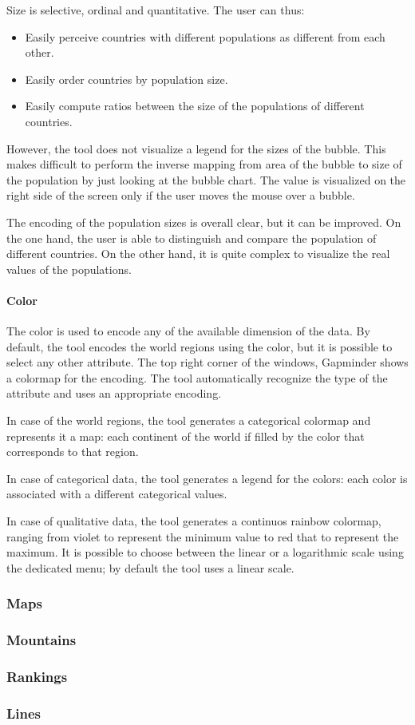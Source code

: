 Size is selective, ordinal and quantitative.
The user can thus:
\begin{itemize}
    \item Easily perceive countries with different populations as different from each other.
    \item Easily order countries by population size.
    \item Easily compute ratios between the size of the populations of different countries.
\end{itemize}

However, the tool does not visualize a legend for the sizes of the bubble.
This makes difficult to perform the inverse mapping from area of the bubble to size of the population by just looking at the bubble chart.
The value is visualized on the right side of the screen only if the user moves the mouse over a bubble.

The encoding of the population sizes is overall clear, but it can be improved.
On the one hand, the user is able to distinguish and compare the population of different countries.
On the other hand, it is quite complex to visualize the real values of the populations.


\paragraph{Color}
The color is used to encode any of the available dimension of the data.
By default, the tool encodes the world regions using the color, but it is possible to select any other attribute.
The top right corner of the windows, Gapminder shows a colormap for the encoding.
The tool automatically recognize the type of the attribute and uses an appropriate encoding.

In case of the world regions, the tool generates a categorical colormap and represents it a map:
each continent of the world if filled by the color that corresponds to that region.

In case of categorical data, the tool generates a legend for the colors:
each color is associated with a different categorical values.


In case of qualitative data, the tool generates a continuos rainbow colormap, ranging from violet to represent the minimum value to red that to represent the maximum.
It is possible to choose between the linear or a logarithmic scale using the dedicated menu;
by default the tool uses a linear scale.


\subsubsection{Maps}

\subsubsection{Mountains}

\subsubsection{Rankings}

\subsubsection{Lines}
